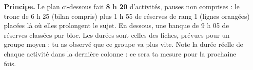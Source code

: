 \documentclass[10pt,a4paper]{article}
\begin{document}
\thispagestyle{fancy}
\vspace{2pt}
\begin{tcolorbox}[boite,left=5pt,right=5pt,top=2pt,bottom=2pt]\small
\textbf{Principe.} Le plan ci-dessous fait \textbf{8 h 20} d'activités, pauses non comprises : le tronc de 6 h 25 (bilan compris) plus 1 h 55 de réserves de rang 1 (lignes orangées) placées là où elles prolongent le sujet. En dessous, une banque de 9 h 05 de réserves classées par bloc. Les durées sont celles des fiches, prévues pour un groupe moyen : tu as observé que ce groupe va plus vite. Note la durée réelle de chaque activité dans la dernière colonne : ce sera ta mesure pour la prochaine fois.
\end{tcolorbox}
\par\vspace{4pt}
\renewcommand{\arraystretch}{1.28}\small
\end{document}
